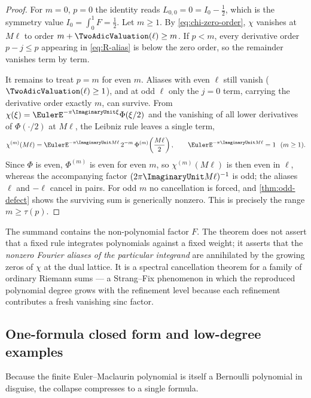 \documentclass[11pt,oneside]{article}
\numberwithin{equation}{section}
\theoremstyle{definition}
\theoremstyle{remark}
\begin{document}
\begin{proof}
For $m=0$, $p=0$ the identity reads $L_{0,0}=0=I_0-\tfrac12$, which is
the symmetry value $I_0=\int_0^1F=\tfrac12$.  Let $m\ge1$.  By
\eqref{eq:chi-zero-order}, $\chi$ vanishes at $M\ell$ to order
$m+\TwoAdicValuation(\ell)\ge m$.  If $p<m$, every derivative order $p-j\le p$
appearing in \eqref{eq:R-alias} is below the zero order, so the
remainder vanishes term by term.

It remains to treat $p=m$ for even $m$.  Aliases with even $\ell$
still vanish ($\TwoAdicValuation(\ell)\ge1$), and at odd $\ell$ only the $j=0$
term, carrying the derivative order exactly $m$, can survive.  From
$\chi(\xi)=\EulerE^{-\pi\ImaginaryUnit\xi}\Phi(\xi/2)$ and the vanishing of all lower
derivatives of $\Phi(\cdot/2)$ at $M\ell$, the Leibniz rule leaves a
single term,
\[
 \chi^{(m)}(M\ell)
 =\EulerE^{-\pi\ImaginaryUnit M\ell}\,2^{-m}\,
 \Phi^{(m)}\!\left(\frac{M\ell}{2}\right),
 \qquad
 \EulerE^{-\pi\ImaginaryUnit M\ell}=1\ \ (m\ge1).
\]
Since $\Phi$ is even, $\Phi^{(m)}$ is even for even $m$, so
$\chi^{(m)}(M\ell)$ is then even in $\ell$, whereas the accompanying
factor $(2\pi\ImaginaryUnit M\ell)^{-1}$ is odd; the aliases $\ell$ and $-\ell$
cancel in pairs.  For odd $m$ no cancellation is forced, and
\cref{thm:odd-defect} shows the surviving sum is generically nonzero.
This is precisely the range $m\ge\tau(p)$.
\end{proof}

\begin{remark}
The summand contains the non-polynomial factor $F$.  The theorem does
not assert that a fixed rule integrates polynomials against a fixed
weight; it asserts that the \emph{nonzero Fourier aliases of the
particular integrand} are annihilated by the growing zeros of $\chi$
at the dual lattice.  It is a spectral cancellation theorem for a
family of ordinary Riemann sums --- a Strang--Fix phenomenon
\cite{StrangFix,deBoorRon} in which the reproduced polynomial degree
grows with the refinement level because each refinement contributes a
fresh vanishing sinc factor.
\end{remark}

\subsection{One-formula closed form and low-degree examples}

Because the finite Euler--Maclaurin polynomial is itself a Bernoulli
polynomial in disguise, the collapse compresses to a single formula.
\end{document}
